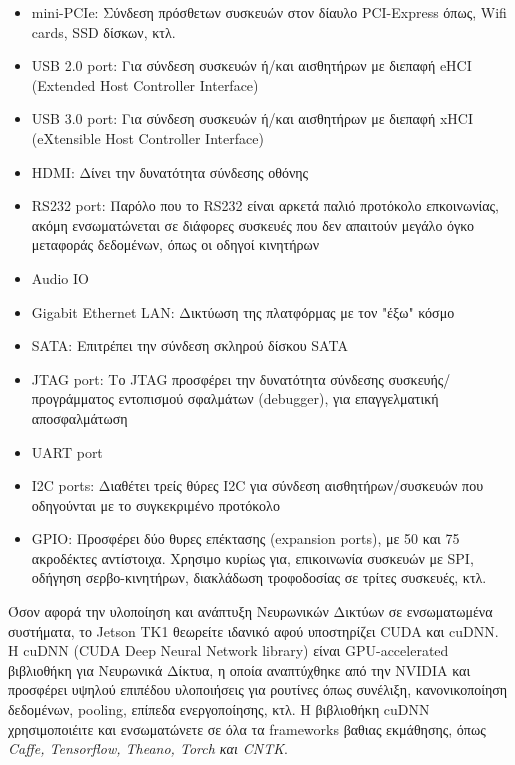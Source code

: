 \begin{itemize}
  \item{mini-PCIe: Σύνδεση πρόσθετων συσκευών στον δίαυλο PCI-Express όπως, Wifi cards, SSD δίσκων, κτλ.}
  \item{USB 2.0 port: Για σύνδεση συσκευών ή/και αισθητήρων με διεπαφή eHCI (Extended Host Controller Interface)}
  \item{USB 3.0 port: Για σύνδεση συσκευών ή/και αισθητήρων με διεπαφή xHCI (eXtensible Host Controller Interface)}
  \item{HDMI: Δίνει την δυνατότητα σύνδεσης οθόνης}
  \item{RS232 port: Παρόλο που το RS232 είναι αρκετά παλιό προτόκολο επκοινωνίας, ακόμη ενσωματώνεται σε διάφορες συσκευές που δεν απαιτούν μεγάλο όγκο μεταφοράς δεδομένων, όπως οι οδηγοί κινητήρων}
  \item{Audio IO}
  \item{Gigabit Ethernet LAN: Δικτύωση της πλατφόρμας με τον "έξω" κόσμο}
  \item{SATA: Επιτρέπει την σύνδεση σκληρού δίσκου SATA}
  \item{JTAG port: Το JTAG προσφέρει την δυνατότητα σύνδεσης συσκευής/προγράμματος εντοπισμού σφαλμάτων (debugger), για επαγγελματική αποσφαλμάτωση}
  \item{UART port}
  \item{I2C ports: Διαθέτει τρείς θύρες I2C για σύνδεση αισθητήρων/συσκευών που οδηγούνται με το συγκεκριμένο προτόκολο}
  \item{GPIO: Προσφέρει δύο θυρες επέκτασης (expansion ports), με 50 και 75 ακροδέκτες αντίστοιχα. Χρησιμο κυρίως για, επικοινωνία συσκευών με SPI, οδήγηση σερβο-κινητήρων, διακλάδωση τροφοδοσίας σε τρίτες συσκευές, κτλ.}
\end{itemize}
Όσον αφορά την υλοποίηση και ανάπτυξη Νευρωνικών Δικτύων σε ενσωματωμένα συστήματα, το Jetson TK1 θεωρείτε ιδανικό
αφού υποστηρίζει CUDA και cuDNN. H cuDNN (CUDA Deep Neural Network library) είναι GPU-accelerated βιβλιοθήκη για Νευρωνικά Δίκτυα,
η οποία αναπτύχθηκε από την NVIDIA και προσφέρει υψηλού επιπέδου υλοποιήσεις για ρουτίνες όπως συνέλιξη, κανονικοποίηση δεδομένων, pooling, επίπεδα ενεργοποίησης, κτλ.
Η βιβλιοθήκη cuDNN χρησιμοποιέιτε και ενσωματώνετε σε όλα τα frameworks βαθιας εκμάθησης, όπως \emph{Caffe, Tensorflow, Theano, Torch και CNTK}.
